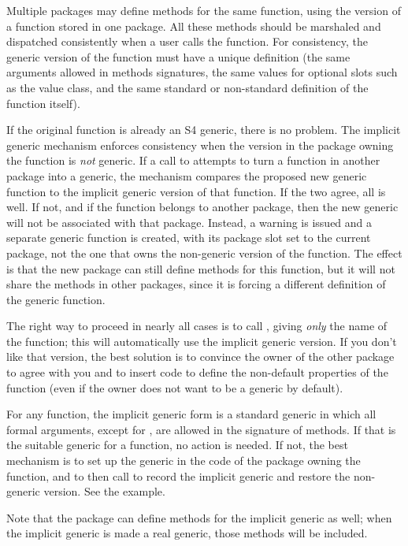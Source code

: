 \begin{Details}\relax
Multiple packages may define methods for the same function, using the
version of a function stored in one package.  All these methods should
be marshaled and dispatched consistently when a user calls the
function.  For consistency, the generic version of the function must
have a unique definition (the same arguments allowed in methods
signatures, the same values for optional slots such as the value
class, and the same standard or non-standard definition of the
function itself).

If the original function is already an S4 generic, there is no
problem.  The implicit generic mechanism enforces consistency when the
version in the package owning the function is \emph{not} generic.  If
a call to  attempts to turn a function in
another package into a generic, the mechanism compares the proposed
new generic function to the implicit generic version of that
function. If the two agree, all is well. If not, and if the function
belongs to another package, then the new generic will not be
associated with that package.  Instead, a warning is issued and a
separate generic function is created, with its package slot set to the
current package, not the one that owns the non-generic version of the
function. The effect is that the new package can still define methods
for this function, but it will not share the methods in other
packages, since it is forcing a different definition of the generic
function.

The right way to proceed in nearly all cases is to call
, giving \emph{only} the name of the
function; this will automatically use the implicit generic version.
If you don't like that version, the best solution is to convince the
owner of the other package to agree with you and to insert code to
define the non-default properties of the function (even if the owner
does not want  to be a generic by default).

For any function, the implicit generic form is a standard generic in
which all formal arguments, except for , are allowed in
the signature of methods. If that is the suitable generic for a
function, no action is needed. If not, the best mechanism is to set up
the generic in the code of the package owning the function, and to
then call  to record the implicit generic
and restore the non-generic version.  See the example.

Note that the package can define methods for the implicit generic as
well; when the implicit generic is made a real generic, those methods
will be included.


\end{Details}
